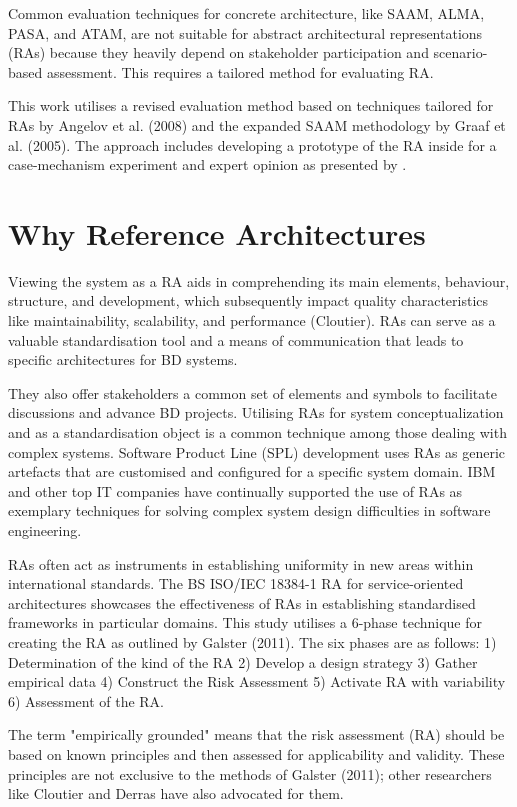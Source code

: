 \documentclass[journal]{IEEEtran}
\begin{document}
Common evaluation techniques for concrete architecture, like SAAM, ALMA, PASA, and ATAM, are not suitable for abstract architectural representations (RAs) because they heavily depend on stakeholder participation and scenario-based assessment. This requires a tailored method for evaluating RA.

This work utilises a revised evaluation method based on techniques tailored for RAs by Angelov et al. (2008) and the expanded SAAM methodology by Graaf et al. (2005). The approach includes developing a prototype of the RA inside for a case-mechanism experiment  and expert opinion as presented by \cite{wieringa2014design}.

\section{Why Reference Architectures}
\label{sec:why_reference_architectures}

Viewing the system as a RA aids in comprehending its main elements, behaviour, structure, and development, which subsequently impact quality characteristics like maintainability, scalability, and performance (Cloutier). RAs can serve as a valuable standardisation tool and a means of communication that leads to specific architectures for BD systems. 

They also offer stakeholders a common set of elements and symbols to facilitate discussions and advance BD projects. Utilising RAs for system conceptualization and as a standardisation object is a common technique among those dealing with complex systems. Software Product Line (SPL) development uses RAs as generic artefacts that are customised and configured for a specific system domain. IBM and other top IT companies have continually supported the use of RAs as exemplary techniques for solving complex system design difficulties in software engineering. 

RAs often act as instruments in establishing uniformity in new areas within international standards. The BS ISO/IEC 18384-1 RA for service-oriented architectures showcases the effectiveness of RAs in establishing standardised frameworks in particular domains. This study utilises a 6-phase technique for creating the RA as outlined by Galster (2011). The six phases are as follows: 1) Determination of the kind of the RA 2) Develop a design strategy 3) Gather empirical data 4) Construct the Risk Assessment 5) Activate RA with variability 6) Assessment of the RA. 

The term "empirically grounded" means that the risk assessment (RA) should be based on known principles and then assessed for applicability and validity. These principles are not exclusive to the methods of Galster (2011); other researchers like Cloutier and Derras have also advocated for them.
\end{document}
